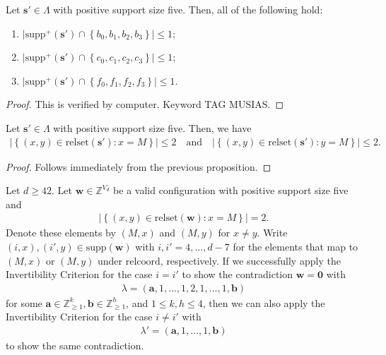 \begin{proposition}
    Let \( \mathbf{s}' \in \Lambda \) with positive support size five. Then, all of the following hold:
    \begin{enumerate}
        \item \( \lvert \mathrm{supp}^+(\mathbf{s}') \cap \left\{ b_0,b_1,b_2,b_3 \right\} \rvert \leq 1 \);
        \item \( \lvert \mathrm{supp}^+(\mathbf{s}') \cap \left\{ c_0,c_1,c_2,c_3 \right\} \rvert \leq 1 \);
        \item \( \lvert \mathrm{supp}^+(\mathbf{s}') \cap \left\{ f_0,f_1,f_2,f_3 \right\} \rvert \leq 1 \).
    \end{enumerate}
\end{proposition}

\begin{proof}
    This is verified by computer. Keyword TAG MUSIAS.
\end{proof}

\begin{corollary}
    Let \( \mathbf{s}' \in \Lambda \) with positive support size five. Then, we have
    \begin{align*}
        \lvert \left\{ (x,y) \in \mathrm{relset}(\mathbf{s}') : x = M \right\} \rvert \leq 2 \quad \text{and} \quad         \lvert \left\{ (x,y) \in \mathrm{relset}(\mathbf{s}') : y = M \right\} \rvert \leq 2.
    \end{align*}
\end{corollary}

\begin{proof}
    Follows immediately from the previous proposition.
\end{proof}

\begin{proposition}
    Let \( d\geq 42 \).
    Let \( \mathbf{w} \in \mathbb{Z}^{V_d} \) be a valid configuration with positive support size five and 
    \begin{align*}
        \lvert \left\{ (x,y) \in \mathrm{relset}(\mathbf{w}) : x = M \right\} \rvert = 2.
    \end{align*}
    Denote these elements by \( (M, x) \) and \( (M, y) \) for \( x \neq y \). Write \( (i,x), (i',y) \in \mathrm{supp}(\mathbf{w}) \) with \( i,i' = 4, \dots, d-7 \) for the elements that map to \( (M, x) \) or \( (M, y) \) under \( \mathrm{relcoord} \), respectively. If we successfully apply the Invertibility Criterion for the case \( i = i' \) to show the contradiction \( \mathbf{w} = \mathbf 0 \) with 
    \begin{align*}
        \lambda = (\mathbf{a},1,\dots,1, 2, 1, \dots, 1, \mathbf{b})
    \end{align*}
    for some \(\mathbf{a} \in \mathbb{Z}^{k}_{\geq 1}, \mathbf{b} \in \mathbb{Z}^{h}_{\geq 1} \), and \( 1 \leq k,h \leq 4 \), then we can also apply the Invertibility Criterion for the case \( i \neq i' \) with
    \begin{align*}
        \lambda' = (\mathbf{a},1, \dots, 1, \mathbf{b})
    \end{align*}
    to show the same contradiction.
\end{proposition}

